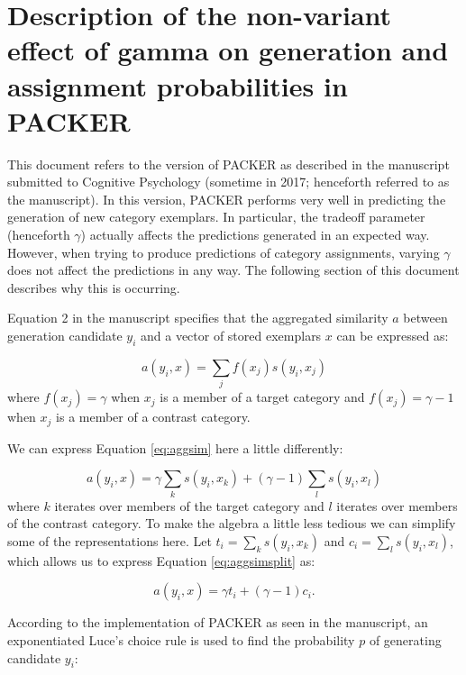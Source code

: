 \documentclass[12pt]{article} \usepackage[letterpaper, margin=1in, headheight=15pt]{geometry}
\begin{document}
\section{Description of the non-variant effect of gamma on generation and assignment probabilities
in PACKER}

This document refers to the version of PACKER as described in the manuscript submitted to Cognitive
Psychology (sometime in 2017; henceforth referred to as the manuscript). In this version, PACKER
performs very well in predicting the generation of new category exemplars. In particular, the
tradeoff parameter (henceforth $\gamma$) actually affects the predictions generated in an expected
way. However, when trying to produce predictions of category assignments, varying $\gamma$ does not
affect the predictions in any way. The following section of this document describes why this is
occurring.

Equation 2 in the manuscript specifies that the aggregated similarity $a$ between generation
candidate $y_i$ and a vector of stored exemplars $x$ can be expressed as:

\begin{equation} a(y_i, x) = \sum_j{f(x_j) s(y_i, x_j)}
\label{eq:aggsim}
\end{equation} where $f(x_j) = \gamma$ when $x_j$ is a member of a target category and $f(x_j) =
\gamma - 1$ when $x_j$ is a member of a contrast category.

We can express Equation \ref{eq:aggsim} here a little differently:

\begin{equation} a(y_i,x) = \gamma \sum_k{s(y_i,x_k)} + (\gamma-1) \sum_l{s(y_i,x_l)}
\label{eq:aggsimsplit}
\end{equation} where $k$ iterates over members of the target category and $l$ iterates over members
of the contrast category. To make the algebra a little less tedious we can simplify some of the
representations here. Let $t_i = \sum_k{s(y_i,x_k)}$ and $c_i = \sum_l{s(y_i,x_l)}$, which allows us to
express Equation \ref{eq:aggsimsplit} as:

\begin{equation} a(y_i,x) = \gamma t_i + (\gamma-1) c_i .
\label{eq:aggsimsimp}
\end{equation}

According to the implementation of PACKER as seen in the manuscript, an exponentiated Luce's choice
rule is used to find the probability $p$ of generating candidate $y_i$:
\end{document}
